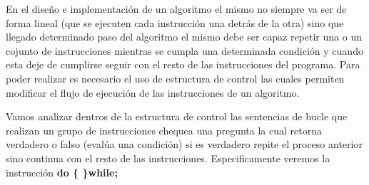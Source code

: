 En el diseño e implementación de un algoritmo el mismo no siempre va ser de forma lineal (que se ejecuten cada instrucción una detrás de la otra) sino que llegado determinado paso del algoritmo el mismo debe ser capaz repetir una o un cojunto de instrucciones mientras se cumpla una determinada condición y cuando esta deje de cumplirse seguir con el resto de las instrucciones del programa. Para poder realizar es necesario el uso de estructura de control las cuales permiten modificar el flujo de ejecución de las instrucciones de un algoritmo.

Vamos analizar dentros de la estructura de control las sentencias de bucle que
realizan un grupo de instrucciones chequea una pregunta la cual retorna verdadero o falso (evalúa una condición) si es verdadero repite el proceso anterior sino continua con el resto de las instrucciones. Especificamente veremos la instrucción \textbf{do \{ \}while;}